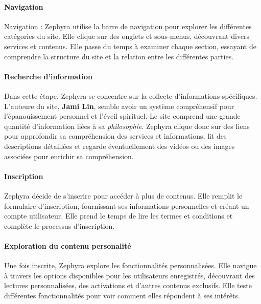 \documentclass[9pt]{report}
\newcommand{\mathpazott}{\fontfamily{pplj}\selectfont}
\renewcommand{\texttt}[1]{{\scriptsize\mathpazott #1}}
\begin{document}
\begin{multicols*}{2}


  \paragraph{Navigation}
  Navigation : Zephyra utilise la barre de navigation pour explorer 
  les différentes catégories du site. Elle clique sur des onglets et 
  sous-menus, découvrant divers services et contenus. 
  Elle passe du temps à examiner chaque section, essayant de 
  comprendre la structure du site et la relation entre les différentes 
  parties.

  \paragraph{Recherche d'information}
  Dans cette étape, 
  Zephyra se concentre sur la collecte d'informations spécifiques. 
  L'auteure du site, \textbf{Jami Lin}, semble avoir un système  
  compréhensif pour l'épanouissement personnel et l'éveil spirituel. 
  Le site comprend une grande quantité d'information liées à 
  sa \textit{philosophie}. 
  Zephyra clique donc sur des liens pour approfondir sa compréhension des 
  services et  informations, 
  lit des descriptions détaillées et regarde 
  éventuellement des vidéos ou des images associées pour enrichir 
  sa compréhension.




  \paragraph{Inscription}
  Zephyra décide de s'inscrire pour accéder à plus de contenus. Elle 
  remplit le formulaire d'inscription, fournissant ses informations
  personnelles et créant un compte utilisateur. Elle prend le temps de 
  lire les termes et conditions et complète le processus d'inscription.



  \paragraph{Exploration du contenu personalité}
  Une fois inscrite, Zephyra explore les fonctionnalités personnalisées. 
  Elle navigue à travers les options disponibles pour 
  les utilisateurs enregistrés, découvrant des lectures personnalisées, 
  des activations et d'autres contenus exclusifs. Elle teste différentes 
  fonctionnalités pour voir comment elles répondent à ses intérêts.



\end{multicols*}
\end{document}
